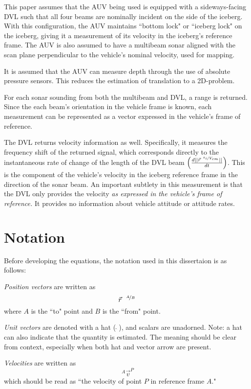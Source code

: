 This paper assumes that the AUV being used is equipped with a sideways-facing DVL such that all four beams are nominally incident on the side of the iceberg. With this configuration, the AUV maintains ``bottom lock" or ``iceberg lock" on the iceberg, giving it a measurement of its velocity in the iceberg's reference frame. The AUV is also assumed to have a multibeam sonar aligned with the scan plane perpendicular to the vehicle's nominal velocity, used for mapping. 

It is assumed that the AUV can measure depth through the use of absolute pressure sensors. This reduces the estimation of translation to a 2D-problem.

For each sonar sounding from both the multibeam and DVL, a range is returned. Since the each beam's orientation in the vehicle frame is known, each measurement can be represented as a vector expressed in the vehicle's frame of reference.

The DVL returns velocity information as well. Specifically, it measures the frequency shift of the returned signal, which corresponds directly to the instantaneous rate of change of the length of the DVL beam $\left( \frac{d||\vec{r}^{~\nicefrac{s_i}{V_{cm}}}||}{dt}\right)$. This is the component of the vehicle's velocity in the iceberg reference frame in the direction of the sonar beam. An important subtlety in this measurement is that the DVL only provides the velocity \emph{as expressed in the vehicle's frame of reference.} It provides no information about vehicle attitude or attitude rates. 

\section{Notation}

Before developing the equations, the notation used in this dissertaion is as follows:

\emph{Position vectors} are written as
\begin{equation*}
 \vec{r}^{~~\nicefrac{A}{B}} 
\end{equation*}
where $A$ is the ``to" point and $B$ is the ``from" point.

\emph{Unit vectors} are denoted with a hat ($~\hat{}~$), and scalars are unadorned. Note: a hat can also indicate that the quantity is estimated. The meaning should be clear from context, especially when both hat and vector arrow are present.

\emph{Velocities} are written as 
\begin{equation*} 
~^{A}\vec{v}^{P} 
\end{equation*}
which should be read as ``the velocity of point $P$ in reference frame $A$."

